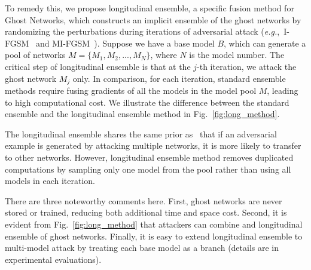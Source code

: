 \documentclass[letterpaper]{article} %
\newcommand{\citet}[1]{\citeauthor{#1} \shortcite{#1}}
\def\eg{\emph{e.g.}}
\begin{document}
To remedy this, we propose longitudinal ensemble, a specific fusion method for Ghost Networks, which constructs an implicit ensemble of the ghost networks by randomizing the perturbations during iterations of adversarial attack (\eg,~I-FGSM~\cite{kurakin2016adversarial} and MI-FGSM~\cite{dong2017boosting}). Suppose we have a base model $B$, which can generate a pool of networks $M=\{M_1,M_2,...,M_N\}$, where $N$ is the model number. The critical step of longitudinal ensemble is that at the $j$-th iteration, we attack the ghost network $M_j$ only. In comparison, for each iteration, standard ensemble methods require fusing gradients of all the models in the model pool $M$, leading to high computational cost. We illustrate the difference between the standard ensemble and the longitudinal ensemble method in Fig.~\ref{fig:long_method}.

The longitudinal ensemble shares the same prior as~\citet{liu2016delving} that if an adversarial example is generated by attacking multiple networks, it is more likely to transfer to other networks. However, longitudinal ensemble method removes duplicated computations by sampling only one model from the pool rather than using all models in each iteration.

There are three noteworthy comments here. First, ghost networks are never stored or trained, reducing both additional time and space cost. Second, it is evident from Fig.~\ref{fig:long_method} that attackers can combine \citet{liu2016delving} and longitudinal ensemble of ghost networks. Finally, it is easy to extend longitudinal ensemble to multi-model attack by treating each base model as a branch (details are in experimental evaluations).
\end{document}
